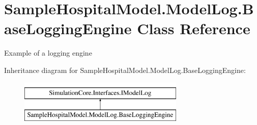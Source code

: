 \hypertarget{class_sample_hospital_model_1_1_model_log_1_1_base_logging_engine}{}\section{Sample\+Hospital\+Model.\+Model\+Log.\+Base\+Logging\+Engine Class Reference}
\label{class_sample_hospital_model_1_1_model_log_1_1_base_logging_engine}


Example of a logging engine  


Inheritance diagram for Sample\+Hospital\+Model.\+Model\+Log.\+Base\+Logging\+Engine\+:\begin{figure}[H]
\begin{center}
\leavevmode
\includegraphics[height=2.000000cm]{class_sample_hospital_model_1_1_model_log_1_1_base_logging_engine}
\end{center}
\end{figure}
